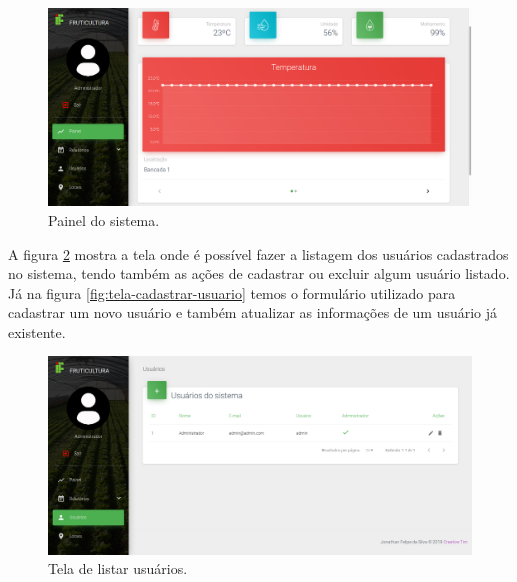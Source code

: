 \begin{figure}[H]
    \centering
    \includegraphics[scale=0.3]{04-figuras/tela_painel.png}
    \caption{Painel do sistema.}
    \vspace{-\baselineskip}
    \label{fig:tela-dashboard}
\end{figure}

A figura \ref{fig:tela-listar-usuarios} mostra a tela onde é possível fazer a listagem dos usuários cadastrados no sistema, tendo também as ações de cadastrar ou excluir algum usuário listado. Já na figura \ref{fig:tela-cadastrar-usuario} temos o formulário utilizado para cadastrar um novo usuário e também atualizar as informações de um usuário já existente.

\begin{figure}[H]
    \centering
    \includegraphics[scale=0.3]{04-figuras/tela_listar_usuarios.png}
    \caption{Tela de listar usuários.}
    \vspace{-\baselineskip}
    \label{fig:tela-listar-usuarios}
\end{figure}

